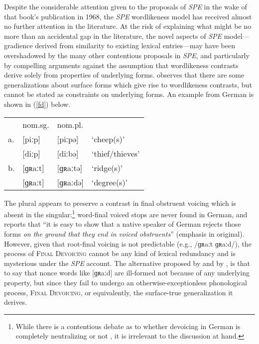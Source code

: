 Despite the considerable attention given to the proposals of \emph{SPE} in the wake of that book's publication in 1968, the \emph{SPE} wordlikeness model has received almost no further attention in the literature. At the risk of explaining what might be no more than an accidental gap in the literature, the novel aspects of \emph{SPE} model---gradience derived from similarity to existing lexical entries---may have been overshadowed by the many other contentious proposals in \emph{SPE}, and particularly by compelling arguments against the assumption that wordlikeness contrasts derive solely from properties of underlying forms. \citet{Shibatani1973} observes that there are some generalizations about surface forms which give rise to wordlikeness contrasts, but cannot be stated as constraints on underlying forms. An example from German is shown in (\ref{fd}) below.

\begin{example} 
\label{fd}
\begin{tabular}{l l l l}
   & nom.sg. & nom.pl.    \\
a. & [piːp]    & [piːpə]  & `cheep(s)'      \\
   & [diːp]    & [diːbə]  & `thief/thieves' \\
b. & [ɡʀaːt]   & [ɡʀaːtə] & `ridge(s)'      \\
   & [ɡʀaːt]   & [ɡʀaːdə] & `degree(s)'     \\
\end{tabular}
\end{example}

\noindent The plural appears to preserve a contrast in final obstruent voicing which is absent in the singular:\footnote{While there is a contentious debate as to whether devoicing in German is completely neutralizing \citep[e.g.,][]{Fourakis1984} or not \citep[e.g.,][]{Port1985}, it is irrelevant to the discussion at hand.} word-final voiced stops are never found in German, and \citet[95]{Shibatani1973} reports that ``it is easy to show that a native speaker of German rejects those forms \emph{on the ground that they end in voiced obstruents}'' (emphasis in original). However, given that root-final voicing is not predictable (e.g., /ɡʀaːt \alt{} ɡʀaːd/), the process of \textsc{Final Devoicing} cannot be any kind of lexical redundancy and is mysterious under the \emph{SPE} account. The alternative proposed by \citeauthor{Shibatani1973} and by \citet{Clayton1976}, is that to say that nonce words like [ɡʀaːd] are ill-formed not because of any underlying property, but since they fail to undergo an otherwise-exceptionless phonological process, \textsc{Final Devoicing}, or equivalently, the surface-true generalization it derives.

